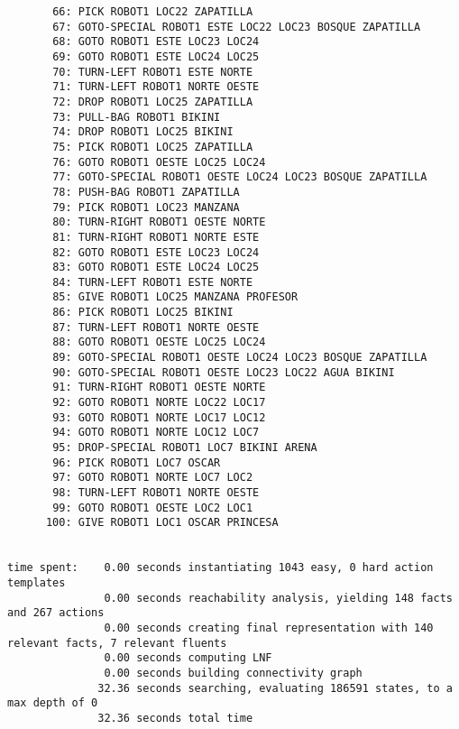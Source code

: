 \documentclass{article}
\begin{document}
\begin{lstlisting}
       66: PICK ROBOT1 LOC22 ZAPATILLA
       67: GOTO-SPECIAL ROBOT1 ESTE LOC22 LOC23 BOSQUE ZAPATILLA
       68: GOTO ROBOT1 ESTE LOC23 LOC24
       69: GOTO ROBOT1 ESTE LOC24 LOC25
       70: TURN-LEFT ROBOT1 ESTE NORTE
       71: TURN-LEFT ROBOT1 NORTE OESTE
       72: DROP ROBOT1 LOC25 ZAPATILLA
       73: PULL-BAG ROBOT1 BIKINI
       74: DROP ROBOT1 LOC25 BIKINI
       75: PICK ROBOT1 LOC25 ZAPATILLA
       76: GOTO ROBOT1 OESTE LOC25 LOC24
       77: GOTO-SPECIAL ROBOT1 OESTE LOC24 LOC23 BOSQUE ZAPATILLA
       78: PUSH-BAG ROBOT1 ZAPATILLA
       79: PICK ROBOT1 LOC23 MANZANA
       80: TURN-RIGHT ROBOT1 OESTE NORTE
       81: TURN-RIGHT ROBOT1 NORTE ESTE
       82: GOTO ROBOT1 ESTE LOC23 LOC24
       83: GOTO ROBOT1 ESTE LOC24 LOC25
       84: TURN-LEFT ROBOT1 ESTE NORTE
       85: GIVE ROBOT1 LOC25 MANZANA PROFESOR
       86: PICK ROBOT1 LOC25 BIKINI
       87: TURN-LEFT ROBOT1 NORTE OESTE
       88: GOTO ROBOT1 OESTE LOC25 LOC24
       89: GOTO-SPECIAL ROBOT1 OESTE LOC24 LOC23 BOSQUE ZAPATILLA
       90: GOTO-SPECIAL ROBOT1 OESTE LOC23 LOC22 AGUA BIKINI
       91: TURN-RIGHT ROBOT1 OESTE NORTE
       92: GOTO ROBOT1 NORTE LOC22 LOC17
       93: GOTO ROBOT1 NORTE LOC17 LOC12
       94: GOTO ROBOT1 NORTE LOC12 LOC7
       95: DROP-SPECIAL ROBOT1 LOC7 BIKINI ARENA
       96: PICK ROBOT1 LOC7 OSCAR
       97: GOTO ROBOT1 NORTE LOC7 LOC2
       98: TURN-LEFT ROBOT1 NORTE OESTE
       99: GOTO ROBOT1 OESTE LOC2 LOC1
      100: GIVE ROBOT1 LOC1 OSCAR PRINCESA


time spent:    0.00 seconds instantiating 1043 easy, 0 hard action templates
               0.00 seconds reachability analysis, yielding 148 facts and 267 actions
               0.00 seconds creating final representation with 140 relevant facts, 7 relevant fluents
               0.00 seconds computing LNF
               0.00 seconds building connectivity graph
              32.36 seconds searching, evaluating 186591 states, to a max depth of 0
              32.36 seconds total time
\end{lstlisting}
\end{document}
